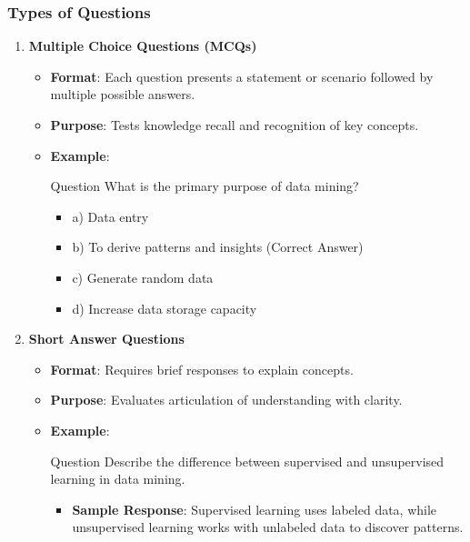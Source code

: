 \documentclass{beamer}
\begin{document}
\begin{frame}[fragile]
    \frametitle{Types of Questions}
    \begin{enumerate}
        \item \textbf{Multiple Choice Questions (MCQs)}
            \begin{itemize}
                \item \textbf{Format}: Each question presents a statement or scenario followed by multiple possible answers.
                \item \textbf{Purpose}: Tests knowledge recall and recognition of key concepts.
                \item \textbf{Example}:
                  \begin{block}{Question}
                    What is the primary purpose of data mining?
                  \end{block}
                  \begin{itemize}
                      \item a) Data entry
                      \item b) To derive patterns and insights (Correct Answer)
                      \item c) Generate random data
                      \item d) Increase data storage capacity
                  \end{itemize}
            \end{itemize}
        \item \textbf{Short Answer Questions}
            \begin{itemize}
                \item \textbf{Format}: Requires brief responses to explain concepts.
                \item \textbf{Purpose}: Evaluates articulation of understanding with clarity.
                \item \textbf{Example}:
                  \begin{block}{Question}
                    Describe the difference between supervised and unsupervised learning in data mining.
                  \end{block}
                  \begin{itemize}
                      \item \textbf{Sample Response}: Supervised learning uses labeled data, while unsupervised learning works with unlabeled data to discover patterns.
                  \end{itemize}
            \end{itemize}
    \end{enumerate}
\end{frame}
\end{document}
